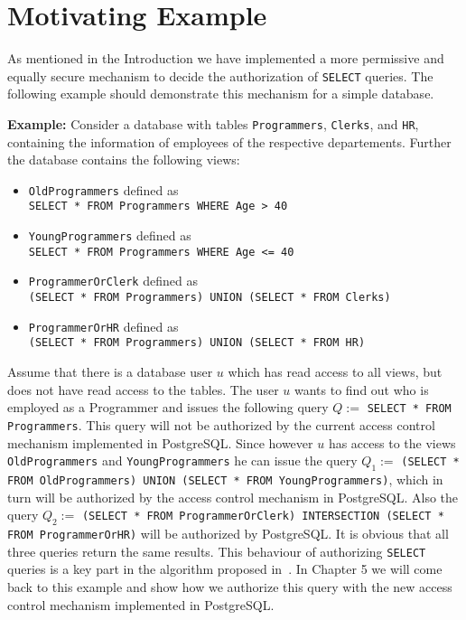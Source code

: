 \section{Motivating Example}

As mentioned in the Introduction we have implemented a more permissive and equally secure mechanism to decide the authorization of \texttt{SELECT} queries.
%
The following example should demonstrate this mechanism for a simple database.

\smallskip
\noindent
{\bf Example:}
%
Consider a database with tables \texttt{Programmers}, \texttt{Clerks}, and \texttt{HR}, containing the information of employees of the respective departements.
%
Further the database contains the following views:
\begin{itemize}
	\item \texttt{OldProgrammers} defined as \\ \texttt{SELECT * FROM Programmers WHERE Age > 40}
	\item \texttt{YoungProgrammers} defined as \\ \texttt{SELECT * FROM Programmers WHERE Age <= 40}
	\item \texttt{ProgrammerOrClerk} defined as \\ \texttt{(SELECT * FROM Programmers) UNION (SELECT * FROM Clerks)}
	\item \texttt{ProgrammerOrHR} defined as \\ \texttt{(SELECT * FROM Programmers) UNION (SELECT * FROM HR)}
\end{itemize}
%
Assume that there is a database user $u$ which has read access to all views, but does not have read access to the tables.
%
The user $u$ wants to find out who is employed as a Programmer and issues the following query $Q := $ \texttt{SELECT * FROM Programmers}. 
%
This query will not be authorized by the current access control mechanism implemented in PostgreSQL.
%
Since however $u$ has access to the views \texttt{OldProgrammers} and \texttt{YoungProgrammers} he can issue the query $Q_1 := $ \texttt{(SELECT * FROM OldProgrammers) UNION (SELECT * FROM YoungProgrammers)}, which in turn will be authorized by the access control mechanism in PostgreSQL.
%
Also the query $Q_2 := $ \texttt{(SELECT * FROM ProgrammerOrClerk) INTERSECTION (SELECT * FROM ProgrammerOrHR)} will be authorized by PostgreSQL.
%
It is obvious that all three queries return the same results.
%
This behaviour of authorizing \texttt{SELECT} queries is a key part in the algorithm proposed in~\cite{guarnieri2016strong}.
%
In Chapter 5 we will come back to this example and show how we authorize this query with the new access control mechanism implemented in PostgreSQL.

